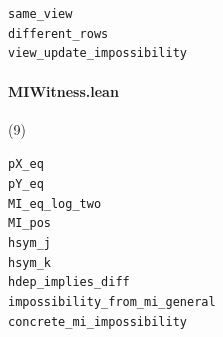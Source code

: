 {\footnotesize
\texttt{same\_view}\\
\texttt{different\_rows}\\
\texttt{view\_update\_impossibility}\\
}

\paragraph{MIWitness.lean} (9)

{\footnotesize
\texttt{pX\_eq}\\
\texttt{pY\_eq}\\
\texttt{MI\_eq\_log\_two}\\
\texttt{MI\_pos}\\
\texttt{hsym\_j}\\
\texttt{hsym\_k}\\
\texttt{hdep\_implies\_diff}\\
\texttt{impossibility\_from\_mi\_general}\\
\texttt{concrete\_mi\_impossibility}\\
}
